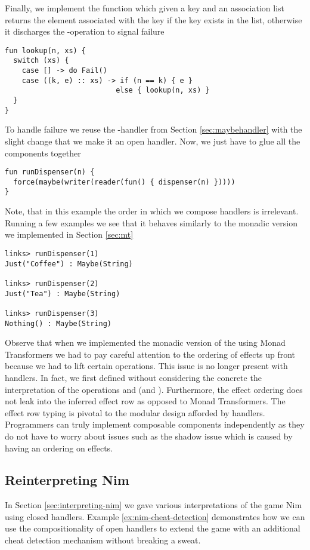 \begin{example}
Finally, we implement the  function which given a key and an association list returns the element associated with the key if the key exists in the list, otherwise it discharges the -operation to signal failure
\begin{lstlisting}[style=links]
fun lookup(n, xs) {
  switch (xs) {
    case [] -> do Fail()
    case ((k, e) :: xs) -> if (n == k) { e }
                          else { lookup(n, xs) }
  }
}
\end{lstlisting}
To handle failure we reuse the -handler from Section \ref{sec:maybehandler} with the slight change that we make it an open handler. Now, we just have to glue all the components together
\begin{lstlisting}[style=links]
fun runDispenser(n) {
  force(maybe(writer(reader(fun() { dispenser(n) }))))
}
\end{lstlisting}
Note, that in this example the order in which we compose handlers is irrelevant.
Running a few examples we see that it behaves similarly to the monadic version we implemented in Section \ref{sec:mt}
\begin{lstlisting}[style=links]
links> runDispenser(1)
Just("Coffee") : Maybe(String)

links> runDispenser(2)
Just("Tea") : Maybe(String)

links> runDispenser(3)
Nothing() : Maybe(String)
\end{lstlisting}
\end{example}
Observe that when we implemented the monadic version of the  using Monad Transformers we had to pay careful attention to the ordering of effects up front because we had to lift certain operations. This issue is no longer present with handlers. In fact, we first defined  without considering the concrete the interpretation of the operations  and  (and ). Furthermore, the effect ordering does not leak into the inferred effect row as opposed to Monad Transformers. The effect row typing is pivotal to the modular design afforded by handlers. Programmers can truly implement composable components independently as they do not have to worry about issues such as the shadow issue which is caused by having an ordering on effects.

\subsection{Reinterpreting Nim}\label{sec:reinterpreting-nim}
In Section \ref{sec:interpreting-nim} we gave various interpretations of the game Nim using closed handlers. Example \ref{ex:nim-cheat-detection} demonstrates how we can use the compositionality of open handlers to extend the game with an additional cheat detection mechanism without breaking a sweat.

